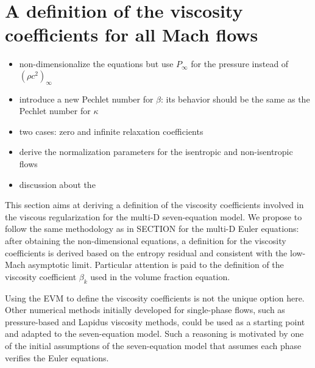 \documentclass[preprint,10pt]{elsarticle}
\begin{document}
\section{A definition of the viscosity coefficients for all Mach flows}\label{sec:low-Mach}
\begin{itemize}
\item non-dimensionalize the equations but use $P_\infty$ for the pressure instead of $(\rho c^2)_\infty$
\item introduce a new Pechlet number for $\beta$: its behavior should be the same as the Pechlet number for $\kappa$
\item two cases: zero and infinite relaxation coefficients
\item derive the normalization parameters for the isentropic and non-isentropic flows
\item discussion about the 
\end{itemize}
%
This section aims at deriving a definition of the viscosity coefficients involved in the viscous regularization for the multi-D seven-equation model. We propose to follow the same methodology as in SECTION for the multi-D Euler equations: after obtaining the non-dimensional equations, a definition for the viscosity coefficients is derived based on the entropy residual and consistent with the low-Mach asymptotic limit. Particular attention is paid to the definition of the viscosity coefficient $\beta_k$ used in the volume fraction equation.

Using the EVM to define the viscosity coefficients is not the unique option here. Other numerical methods initially developed for single-phase flows, such as pressure-based and Lapidus viscosity methods, could be used as a starting point and adapted to the seven-equation model. Such a reasoning is motivated by one of the initial assumptions of the seven-equation model that assumes each phase verifies the Euler equations.
\end{document}
